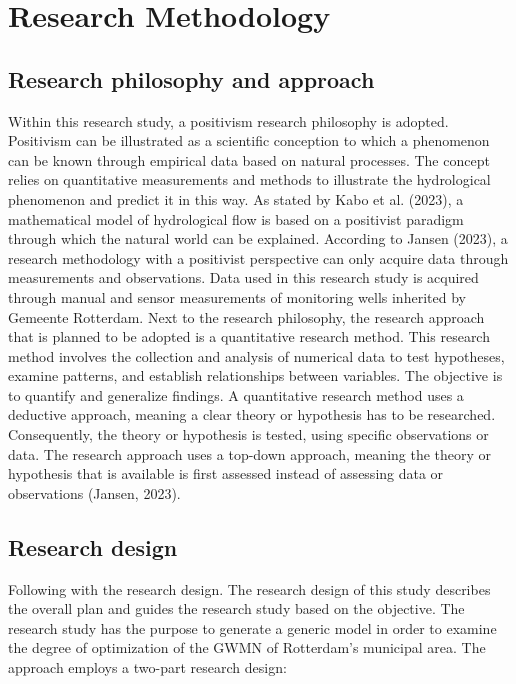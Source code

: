 \chapter{Research Methodology}
\label{chapter: RM}

\section{Research philosophy and approach}
Within this research study, a positivism research philosophy is adopted. Positivism can be illustrated as a scientific conception to which a phenomenon can be known through empirical data based on natural processes. The concept relies on quantitative measurements and methods to illustrate the hydrological phenomenon and predict it in this way. As stated by Kabo et al. (2023), a mathematical model of hydrological flow is based on a positivist paradigm through which the natural world can be explained. According to Jansen (2023), a research methodology with a positivist perspective can only acquire data through measurements and observations. Data used in this research study is acquired through manual and sensor measurements of monitoring wells inherited by Gemeente Rotterdam. Next to the research philosophy, the research approach that is planned to be adopted is a quantitative research method. This research method involves the collection and analysis of numerical data to test hypotheses, examine patterns, and establish relationships between variables. The objective is to quantify and generalize findings. A quantitative research method uses a deductive approach, meaning a clear theory or hypothesis has to be researched. Consequently, the theory or hypothesis is tested, using specific observations or data. The research approach uses a top-down approach, meaning the theory or hypothesis that is available is first assessed instead of assessing data or observations (Jansen, 2023).

\section{Research design}
Following with the research design. The research design of this study describes the overall plan and guides the research study based on the objective. The research study has the purpose to generate a generic model in order to examine the degree of optimization of the GWMN of Rotterdam's municipal area. The approach employs a two-part research design:

